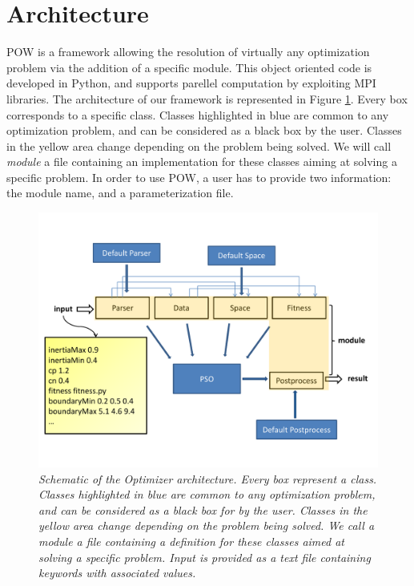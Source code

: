 \documentclass[a4paper, 12pt]{article}
\begin{document}
\section{Architecture}

POW is a framework allowing the resolution of virtually any optimization problem via the addition of a specific module. This object oriented code is developed in Python, and supports parellel computation by exploiting MPI libraries. The architecture of our framework is represented in Figure \ref{architecture}. Every box corresponds to a specific class. Classes highlighted in blue are common to any optimization problem, and can be considered as a black box by the user. Classes in the yellow area change depending on the problem being solved. We will call \emph{module} a file containing an implementation for these classes aiming at solving a specific problem. In order to use POW, a user has to provide two information: the module name, and a parameterization file.\\  

\begin{figure}[htp!]
\centering
\includegraphics[scale=0.55]{PSO-architecture.pdf}
\caption{\emph{Schematic of the Optimizer architecture. Every box represent a class. Classes highlighted in blue are common to any optimization problem, and can be considered as a black box for by the user. Classes in the yellow area change depending on the problem being solved. We call a module a file containing a definition for these classes aimed at solving a specific problem. Input is provided as a text file containing keywords with associated values.}}
\label{architecture}
\end{figure}
\end{document}
